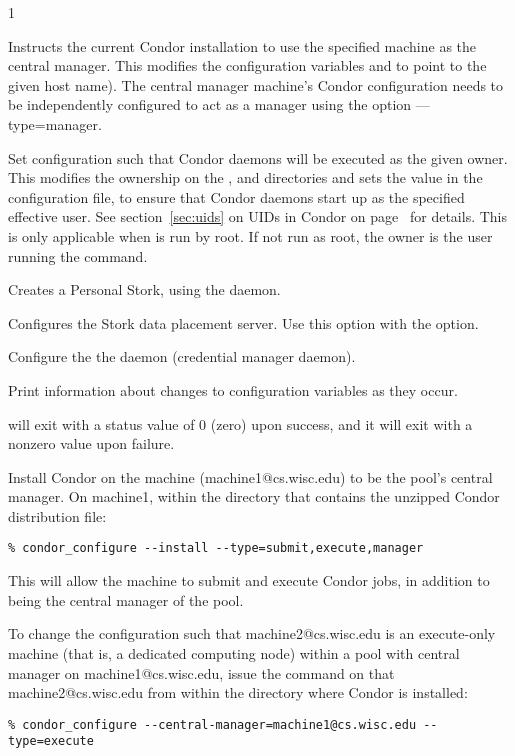 \begin{ManPage}{\label{man-condor-configure}}{1}
\begin{Options}
	 {Instructs
	the current Condor installation to use the specified machine
	as the central manager. 
	This modifies the configuration variables 
	and  to point to the given host name).
	The central manager machine's Condor configuration needs
	to be independently configured to 
	act as a manager using the option ---type=manager. }

	 {Set configuration
	such that Condor daemons will be executed as the given owner.
	This modifies the 
	ownership on the ,  and 
	directories and sets the  value
	in the configuration file,
	to ensure that Condor daemons start up as the specified effective user.
	See section~\ref{sec:uids} on
        UIDs in Condor on page~\pageref{sec:uids} for details.
	This is only applicable when  is run by root.
	If not run as root, the owner is the user running
	the  command.  }

	 {Creates a 
	  Personal Stork, using the  daemon.}

	 {Configures the 
	  Stork data placement server.
	  Use this option with the  option.}

	 {Configure the
	  the  daemon (credential manager daemon).}

	 {Print information about changes
	to configuration variables as they occur.}
\end{Options}

\ExitStatus

 will exit with a status value of 0 (zero) upon success,
and it will exit with a nonzero value upon failure.

\Examples
Install Condor on the machine (machine1@cs.wisc.edu)
to be the pool's central manager.
On machine1,
within the directory that contains the unzipped Condor
distribution  file:
\footnotesize
\begin{verbatim}
% condor_configure --install --type=submit,execute,manager
\end{verbatim}
\normalsize
This will allow the machine to submit and execute Condor jobs, 
in addition to being the central manager of the pool.


To change the configuration such that
machine2@cs.wisc.edu is an execute-only machine
(that is, a dedicated computing node)
within a pool with central manager on machine1@cs.wisc.edu,
issue the command on that machine2@cs.wisc.edu
from within the directory where Condor is installed:
\footnotesize
\begin{verbatim}
% condor_configure --central-manager=machine1@cs.wisc.edu --type=execute
\end{verbatim}
\normalsize




\end{ManPage}

